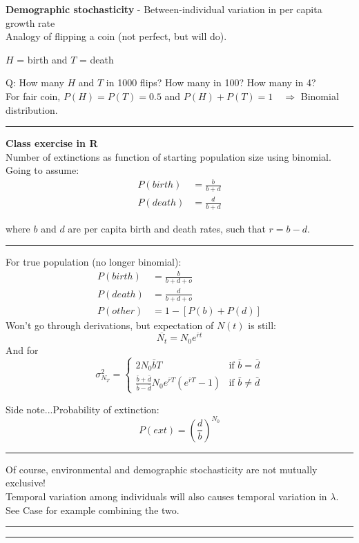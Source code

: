 \documentclass{article}
\newcommand{\note}[1]{\colorbox{gray!20}{#1}}
\begin{document}
\textbf{Demographic stochasticity} - Between-individual variation in per capita growth rate\\
Analogy of flipping a coin (not perfect, but will do).
\begin{center}
	$H$ = birth and $T$ = death
\end{center}
\note{Q:} How many $H$ and $T$ in 1000 flips?  How many in 100?  How many in 4?\\
For fair coin, $P(H)=P(T)=0.5$ and $P(H)+P(T)=1 \quad \Rightarrow $ Binomial distribution.

\rule[0.5ex]{\linewidth}{1pt}
\textbf{Class exercise in R}\\
Number of extinctions as function of starting population size using binomial.\\
Going to assume:
\begin{align*}
	P(birth)&=\frac{b}{b+d}\\
	P(death)&=\frac{d}{b+d}
\end{align*}
\begin{center}
	where $b$ and $d$ are per capita birth and death rates, such that $r=b-d$.
\end{center}

\rule[0.5ex]{\linewidth}{1pt}
For true population (no longer binomial):
\begin{align*}
	P(birth)&=\frac{b}{b+d+o}\\
	P(death)&=\frac{d}{b+d+o}\\
	P(other)&=1-[P(b)+P(d)]
\end{align*}
Won't go through derivations, but expectation of $N(t)$ is still:
\begin{equation*}
	\overline{N_t}=N_0 e^{\bar{r}t}
\end{equation*}
And for
\begin{equation*}
  \sigma_{N_T}^2 =
  \begin{cases} 
        2N_0 \bar{b} T & \text{if } \bar{b}=\bar{d} \\
        \frac{\bar{b}+\bar{d}}{\bar{b}-\bar{d}} N_0 e^{\bar{r}T}(e^{\bar{r}T}-1) & \text{if } \bar{b} \neq \bar{d}
    \end{cases}
 \end{equation*}

Side note...Probability of extinction:
\begin{equation*}
	P(ext)=\left(\frac{d}{b}\right)^{N_0}
\end{equation*}

\rule[0.5ex]{\linewidth}{1pt}
Of course, environmental and demographic stochasticity are not mutually exclusive!\\  
Temporal variation among individuals will also causes temporal variation in $\lambda$.\\
See Case for example combining the two.

\rule[0.5ex]{\linewidth}{1pt}
\rule[0.5ex]{\linewidth}{1pt}
\end{document}
